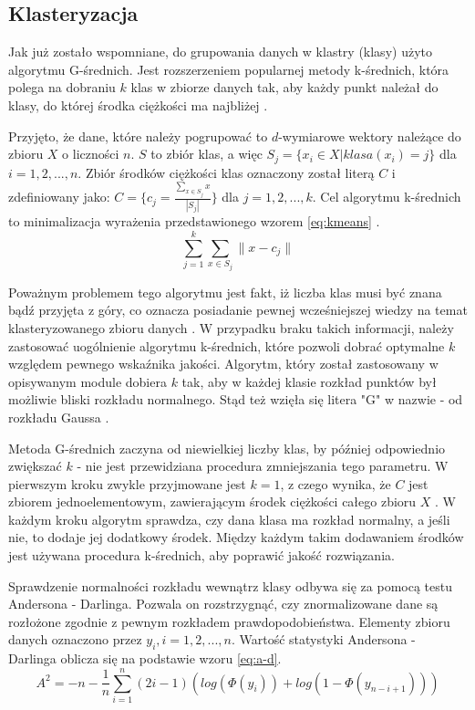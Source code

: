 \subsection{Klasteryzacja}
\qquad Jak już zostało wspomniane, do grupowania danych w klastry (klasy) użyto algorytmu G-średnich. Jest rozszerzeniem popularnej metody k-średnich, która polega na dobraniu $k$ klas w zbiorze danych tak, aby każdy punkt należał do klasy, do której środka ciężkości ma najbliżej \cite{KMeans}.

Przyjęto, że dane, które należy pogrupować to $d$-wymiarowe wektory należące do zbioru $X$ o liczności $n$. $S$ to zbiór klas, a więc $S_{j} = \{x_{i} \in X | klasa(x_{i}) = j\}$ dla $i = 1, 2, ..., n$. Zbiór środków ciężkości klas oznaczony został literą $C$ i zdefiniowany jako: $C = \{c_{j} = \frac{\sum_{x \in S_{j}} x}{|S_{j}|}\}$ dla $j = 1, 2, ..., k$.
Cel algorytmu k-średnich to minimalizacja wyrażenia przedstawionego wzorem \ref{eq:kmeans} .
\begin{equation}
\label{eq:kmeans}
\sum_{j=1}^{k}\sum_{x \in S_{j}} \|x - c_{j}\|
\end{equation}

Poważnym problemem tego algorytmu jest fakt, iż liczba klas musi być znana bądź przyjęta z góry, co oznacza posiadanie pewnej wcześniejszej wiedzy na temat klasteryzowanego zbioru danych \cite{GMeans, GMeansExplanation}. W przypadku braku takich informacji, należy zastosować uogólnienie algorytmu k-średnich, które pozwoli dobrać optymalne $k$ względem pewnego wskaźnika jakości.
Algorytm, który został zastosowany w opisywanym module dobiera $k$ tak, aby w każdej klasie rozkład punktów był możliwie bliski rozkładu normalnego. Stąd też wzięła się litera "G" w nazwie - od rozkładu Gaussa \cite{GMeans}.

Metoda G-średnich zaczyna od niewielkiej liczby klas, by później odpowiednio zwiększać $k$ - nie jest przewidziana procedura zmniejszania tego parametru. W pierwszym kroku zwykle przyjmowane jest $k = 1$, z czego wynika, że $C$ jest zbiorem jednoelementowym, zawierającym środek ciężkości całego zbioru $X$ \cite{GMeans}. W każdym kroku algorytm sprawdza, czy dana klasa ma rozkład normalny, a jeśli nie, to dodaje jej dodatkowy środek. Między każdym takim dodawaniem środków jest używana procedura k-średnich, aby poprawić jakość rozwiązania.

Sprawdzenie normalności rozkładu wewnątrz klasy odbywa się za pomocą testu Andersona - Darlinga. Pozwala on rozstrzygnąć, czy znormalizowane dane są rozłożone zgodnie z pewnym rozkładem prawdopodobieństwa. Elementy zbioru danych oznaczono przez $y_{i}, i = 1, 2, ..., n$. Wartość statystyki Andersona - Darlinga oblicza się na podstawie wzoru \ref{eq:a-d}.
\begin{equation}
\label{eq:a-d}
	A^{2} = -n - \frac{1}{n} \sum_{i=1}^{n}(2i - 1)(log(\Phi(y_{i})) + log(1 - \Phi(y_{n-i+1})))
\end{equation}

